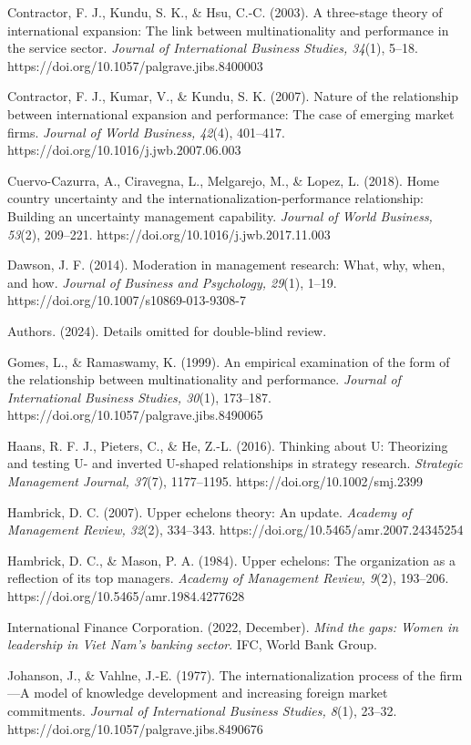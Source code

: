 \documentclass[
  12pt,a4paper]{article}
\begin{document}
Contractor, F. J., Kundu, S. K., \& Hsu, C.-C. (2003). A three-stage
theory of international expansion: The link between multinationality and
performance in the service sector. \emph{Journal of International
Business Studies, 34}(1), 5--18.
https://doi.org/10.1057/palgrave.jibs.8400003

Contractor, F. J., Kumar, V., \& Kundu, S. K. (2007). Nature of the
relationship between international expansion and performance: The case
of emerging market firms. \emph{Journal of World Business, 42}(4),
401--417. https://doi.org/10.1016/j.jwb.2007.06.003

Cuervo-Cazurra, A., Ciravegna, L., Melgarejo, M., \& Lopez, L. (2018).
Home country uncertainty and the internationalization-performance
relationship: Building an uncertainty management capability.
\emph{Journal of World Business, 53}(2), 209--221.
https://doi.org/10.1016/j.jwb.2017.11.003

Dawson, J. F. (2014). Moderation in management research: What, why,
when, and how. \emph{Journal of Business and Psychology, 29}(1), 1--19.
https://doi.org/10.1007/s10869-013-9308-7

Authors. (2024). Details omitted for double-blind review.

Gomes, L., \& Ramaswamy, K. (1999). An empirical examination of the form
of the relationship between multinationality and performance.
\emph{Journal of International Business Studies, 30}(1), 173--187.
https://doi.org/10.1057/palgrave.jibs.8490065

Haans, R. F. J., Pieters, C., \& He, Z.-L. (2016). Thinking about U:
Theorizing and testing U- and inverted U-shaped relationships in
strategy research. \emph{Strategic Management Journal, 37}(7),
1177--1195. https://doi.org/10.1002/smj.2399

Hambrick, D. C. (2007). Upper echelons theory: An update. \emph{Academy
of Management Review, 32}(2), 334--343.
https://doi.org/10.5465/amr.2007.24345254

Hambrick, D. C., \& Mason, P. A. (1984). Upper echelons: The
organization as a reflection of its top managers. \emph{Academy of
Management Review, 9}(2), 193--206.
https://doi.org/10.5465/amr.1984.4277628

International Finance Corporation. (2022, December). \emph{Mind the
gaps: Women in leadership in Viet Nam's banking sector}. IFC, World Bank
Group.

Johanson, J., \& Vahlne, J.-E. (1977). The internationalization process
of the firm---A model of knowledge development and increasing foreign
market commitments. \emph{Journal of International Business Studies,
8}(1), 23--32. https://doi.org/10.1057/palgrave.jibs.8490676
\end{document}
